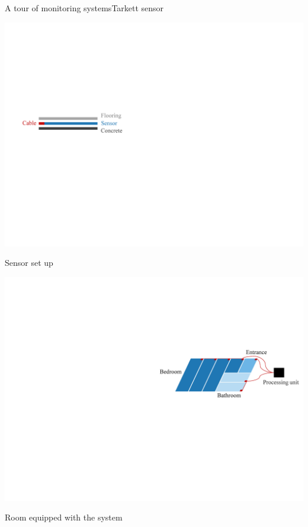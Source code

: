 \documentclass[8pt,t,aspectratio=1610]{beamer}
\begin{document}
\begin{frame}{A tour of monitoring systems}{Tarkett sensor}
\begin{minipage}[t]{0.64\linewidth}
    \begin{minipage}[b]{0.45\linewidth}
    \centering
    \includegraphics[width=0.95\linewidth, trim={20 260 430 200}, clip]{schema_sensor_installation_3.pdf}
    
    \small Sensor set up
    \end{minipage}
    \hfill
    \begin{minipage}[b]{0.54\linewidth}
    \centering
    \includegraphics[width=\linewidth, trim={360 240 5 160}, clip]{schema_sensor_installation_room_3.pdf}
    
    \small Room equipped with the system
    \end{minipage}
\end{minipage}

\end{frame}
\end{document}
